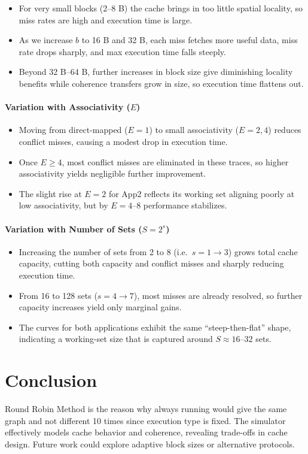 \documentclass{article}
\begin{document}
\begin{itemize}
  \item For very small blocks (2–8 B) the cache brings in too little spatial locality, so miss rates are high and execution time is large.
  \item As we increase $b$ to 16 B and 32 B, each miss fetches more useful data, miss rate drops sharply, and max execution time falls steeply.
  \item Beyond 32 B–64 B, further increases in block size give diminishing locality benefits while coherence transfers grow in size, so execution time flattens out.
\end{itemize}

\paragraph{Variation with Associativity ($E$)}  

\begin{itemize}

  \item Moving from direct‐mapped ($E=1$) to small associativity ($E=2,4$) reduces conflict misses, causing a modest drop in execution time.
  \item Once $E\ge4$, most conflict misses are eliminated in these traces, so higher associativity yields negligible further improvement.
  \item The slight rise at $E=2$ for App2 reflects its working set aligning poorly at low associativity, but by $E=4$–$8$ performance stabilizes.
\end{itemize}

\paragraph{Variation with Number of Sets ($S=2^s$)}

\begin{itemize}
  \item Increasing the number of sets from 2 to 8 (i.e.\ $s=1\to3$) grows total cache capacity, cutting both capacity and conflict misses and sharply reducing execution time.
  \item From 16 to 128 sets ($s=4\to7$), most misses are already resolved, so further capacity increases yield only marginal gains.
  \item The curves for both applications exhibit the same “steep-then-flat” shape, indicating a working-set size that is captured around $S\approx16$–$32$ sets.
\end{itemize}

\section{Conclusion}
Round Robin Method is the reason why always running would give the same graph and not different 10 times since execution type is fixed. 
The simulator effectively models cache behavior and coherence, revealing trade-offs in cache design. Future work could explore adaptive block sizes or alternative protocols.
\end{document}
